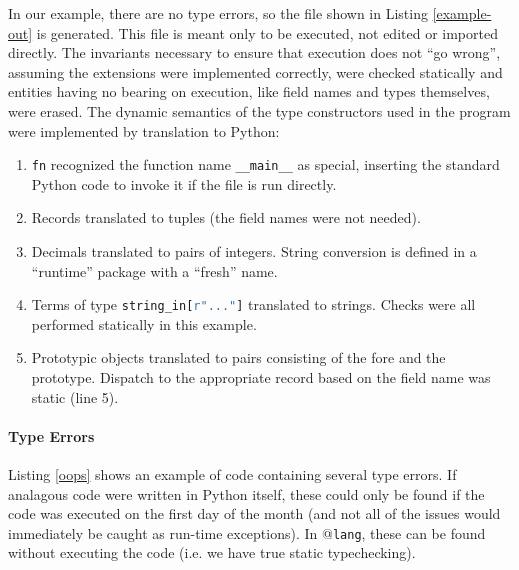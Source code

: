 \documentclass[9pt]{sigplanconf}
\newcommand{\lstinlinep}[1]{\lstinline[language=Python,basicstyle=\ttfamily\small,deletendkeywords={tuple,buffer,map}]{#1}}
\begin{document}
In our example, there are no type errors, so the file shown in Listing \ref{example-out}  is generated. This file is meant only to be executed, not edited or imported directly. The invariants necessary to ensure that execution does not ``go wrong'', assuming the extensions were implemented correctly, were checked statically and entities having no bearing on execution, like field names and types themselves, were erased. The dynamic semantics of the type constructors used in the program were implemented by translation to Python:%
\begin{enumerate}
\item \lstinlinep{fn} recognized the function name \lstinlinep{__main__} as special, inserting the standard Python code to invoke it if the file is run directly.
\item Records translated to tuples (the field names were not needed).
\item Decimals translated to pairs of integers. String conversion is defined in a ``runtime'' package with a ``fresh'' name.
\item Terms of type \lstinlinep{string_in[r"..."]} translated to strings. Checks were all performed  statically in this example.%
\item Prototypic objects translated to pairs consisting of the fore and the prototype. Dispatch to the appropriate record based on the field name was static (line 5).
\end{enumerate}


\paragraph{Type Errors} Listing \ref{oops} shows an example of code containing several type errors. If analagous code were written in Python itself, these could only be found if the code was executed on the first day of the month (and not all of the issues would  immediately be caught as run-time exceptions). In @\texttt{lang}, these can be found without executing the code (i.e. we have true static typechecking).
\end{document}
